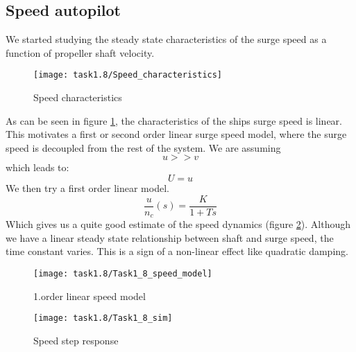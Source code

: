 \subsection{Speed autopilot}\label{subsec:prob1.2}
We started studying the steady state characteristics of the surge speed as a function of propeller shaft velocity. 
\begin{figure}[H]
    \centering
    \texttt{[image: task1.8/Speed\_characteristics]}
    \caption{Speed characteristics}
    \label{fig:1.8-ss}
\end{figure}
As can be seen in figure \ref{fig:1.8-ss}, the characteristics of the ships surge speed is linear. This motivates a first or second order linear surge speed model, where the surge speed is decoupled from the rest of the system. We are assuming $$u>>v$$ which leads to: $$U=u$$ We then try a first order linear model.
\begin{equation}
\frac{u}{n_c}(s) = \frac{K}{1+Ts}
\end{equation}
Which gives us a quite good estimate of the speed dynamics (figure \ref{fig:1.8-speed-model}). Although we have a linear steady state relationship between shaft and surge speed, the time constant varies. This is a sign of a non-linear effect like quadratic damping. 
\begin{figure}[H]
    \centering
    \texttt{[image: task1.8/Task1\_8\_speed\_model]}
    \caption{1.order linear speed model}
    \label{fig:1.8-speed-model}
\end{figure}


\begin{figure}[H]
    \centering
    \texttt{[image: task1.8/Task1\_8\_sim]}
    \caption{Speed step response}
    \label{fig:1.8-step}
\end{figure}